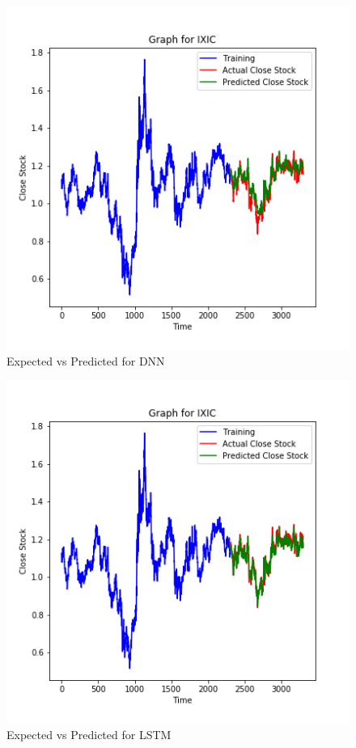 \documentclass[conference]{IEEEtran}
\begin{document}
\FloatBarrier
\begin{figure}[ht]
\centering
    \includegraphics[width=\linewidth]{dnn.png}
    \caption{Expected vs Predicted for DNN} \label{fig:dnn_results}
\end{figure}
\FloatBarrier
\begin{figure}[ht]
\centering
    \includegraphics[width=\linewidth]{lstm.png}
    \caption{Expected vs Predicted for LSTM} \label{fig:lstm_results}
\end{figure}
\FloatBarrier
\end{document}
